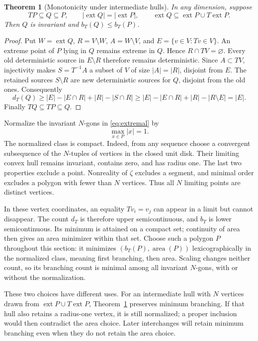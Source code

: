 \documentclass[11pt,a4paper]{article}
\DeclareMathOperator{\ext}{ext}
\newtheorem{theorem}{Theorem}[section]
\theoremstyle{definition}
\theoremstyle{remark}
\numberwithin{equation}{section}
\begin{document}
\begin{theorem}[Monotonicity under intermediate hulls]\label{thm:branching}
In any dimension, suppose
\[
 TP\subseteq Q\subseteq P,\qquad
 |\ext Q|=|\ext P|,\qquad
 \ext Q\subseteq\ext P\cup T\ext P.
\]
Then $Q$ is invariant and $b_T(Q)\le b_T(P)$.
\end{theorem}
\begin{proof}
Put $W=\ext Q$, $R=V\setminus W$, $A=W\setminus V$, and $E=\{v\in V:Tv\in V\}$. An extreme point of $P$ lying in $Q$ remains extreme in $Q$. Hence $R\cap TV=\varnothing$. Every old deterministic source in $E\setminus R$ therefore remains deterministic. Since $A\subset TV$, injectivity makes $S=T^{-1}A$ a subset of $V$ of size $|A|=|R|$, disjoint from $E$. The retained sources $S\setminus R$ are new deterministic sources for $Q$, disjoint from the old ones. Consequently
\[
 d_T(Q)\ge |E|-|E\cap R|+|R|-|S\cap R|
 \ge |E|-|E\cap R|+|R|-|R\setminus E|=|E|.
\]
Finally $TQ\subseteq TP\subseteq Q$.
\end{proof}

Normalize the invariant $N$-gons in \eqref{eq:extremal} by
\[
 \max_{x\in P}|x|=1.
\]
The normalized class is compact. Indeed, from any sequence choose a convergent subsequence of the $N$-tuples of vertices in the closed unit disk. Their limiting convex hull remains invariant, contains zero, and has radius one. The last two properties exclude a point. Nonreality of $\zeta$ excludes a segment, and minimal order excludes a polygon with fewer than $N$ vertices. Thus all $N$ limiting points are distinct vertices.

In these vertex coordinates, an equality $Tv_i=v_j$ can appear in a limit but cannot disappear. The count $d_T$ is therefore upper semicontinuous, and $b_T$ is lower semicontinuous. Its minimum is attained on a compact set; continuity of area then gives an area minimizer within that set. Choose such a polygon $P$ throughout this section: it minimizes $(b_T(P),\operatorname{area}(P))$ lexicographically in the normalized class, meaning first branching, then area. Scaling changes neither count, so its branching count is minimal among all invariant $N$-gons, with or without the normalization.

These two choices have different uses. For an intermediate hull with $N$ vertices drawn from $\ext P\cup T\ext P$, Theorem~\ref{thm:branching} preserves minimum branching. If that hull also retains a radius-one vertex, it is still normalized; a proper inclusion would then contradict the area choice. Later interchanges will retain minimum branching even when they do not retain the area choice.
\end{document}
